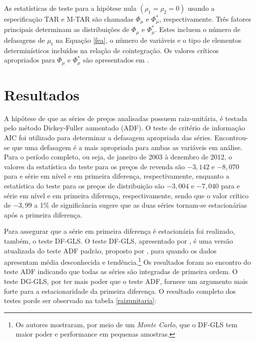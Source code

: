 \documentclass[
	article,			%
	12pt,				%
	openright,			%
	oneside,			%
	a4paper,			%
	english,			%
	brazil				%
	]{abntex2}
\begin{document}
As estatísticas de teste para a hipótese nula $(\rho_{1}=\rho_{2}=0)$ usando a especificação TAR e M-TAR  são chamadas $\Phi_{\mu}$ e $\Phi_{\mu}^{*}$, respectivamente. Três fatores principais determinam as distribuições de $\Phi_{\mu}$ e $\Phi_{\mu}^{*}$. Estes incluem o número de defasagens de $\mu_{t}$ na Equação \ref{fea}, o número de variáveis e o tipo de elementos determinísticos incluídos na relação de cointegração. Os valores críticos apropriados para $\Phi_{\mu}$ e $\Phi_{\mu}^{*}$ são apresentados em .

\section{Resultados}

A hipótese de que as séries de preços analisadas possuem raiz-unitária, é testada pelo método Dickey-Fuller aumentado (ADF). O teste de critério de informação AIC foi utilizado para determinar a defasagem apropriada das séries. Encontrou-se que uma defasagem é a mais apropriada para ambas as variáveis em análise. Para o período completo, ou seja, de janeiro de 2003 à dezembro de 2012, o valores da estatística do teste para os preços de revenda são $-3,142$ e $-8,070$ para e série em nível e em primeira diferença, respectivamente, enquanto a estatística do teste para os preços de distribuição são $-3,004$ e $-7,040$ para e série em nível e em primeira diferença, respectivamente, sendo que o valor crítico de $-3,99$ a 1\% de significância sugere que as duas séries tornam-se estacionárias após a primeira diferença.

Para assegurar que a série em primeira diferença é estacionária foi realizado, também, o teste DF-GLS.
O teste DF-GLS, apresentado por , é uma versão atualizada do teste ADF padrão, proposto por , para quando os dados apresentam média desconhecida e tendência.\footnote{Os autores mostraram, por meio de um \textit{Monte Carlo}, que o DF-GLS tem maior poder e performance em pequenas amostras.} Os resultados foram ao encontro do teste ADF indicando que todas as séries são integradas de primeira ordem.  O teste DG-GLS, por ter mais poder que o teste ADF, fornece um argumento mais forte para a estacionaridade da primeira diferença. O resultado completo dos testes porde ser observado na tabela \ref{raizunitaria}:
\end{document}
